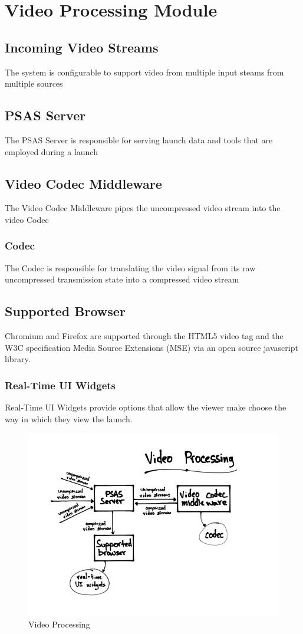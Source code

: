 \section{Video Processing Module}

\subsection{Incoming Video Streams}
The system is configurable to support video from multiple input steams from multiple sources

\subsection{PSAS Server}
The PSAS Server is responsible for serving launch data and tools that are
employed during a launch

\subsection{Video Codec Middleware}
The Video Codec Middleware pipes the uncompressed video stream into the video Codec

\subsubsection{Codec}
The Codec is responsible for translating the video signal from its raw uncompressed transmission 
state into a compressed video stream

\subsection{Supported Browser}
Chromium and Firefox are supported through the HTML5 video tag and the W3C specification Media 
Source Extensions (MSE) via an open source javascript library.

\subsubsection{Real-Time UI Widgets}
Real-Time UI Widgets provide options that allow the viewer make choose the way
in which they view the launch.

\begin{figure}
  \centering
  \includegraphics{imgs/VideoProcessing.png}
  \caption{Video Processing}
\end{figure}
